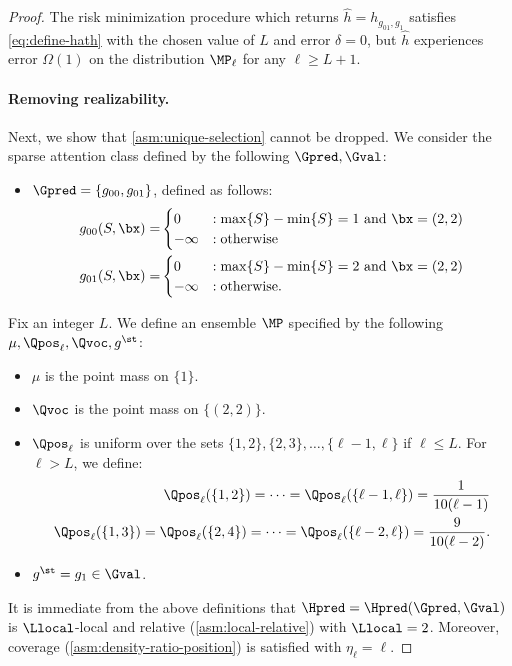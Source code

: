 \documentclass{article}
\begin{document}
\begin{proof}
  The risk minimization procedure which returns $\hat h = h_{g_{01}, g_1}$ satisfies \cref{eq:define-hath} with the chosen value of $L$ and error $\delta = 0$, but $\hat h$ experiences error $\Omega(1)$ on the distribution $\MP_\ell$ for any $\ell \geq L+1$.

  \paragraph{Removing realizability.} Next, we show that \cref{asm:unique-selection} cannot be dropped. We consider the sparse attention class defined by the following $\Gpred, \Gval$:
  \begin{itemize}
\item $\Gpred= \{ g_{00}, g_{01} \}$, defined as follows:
  \begin{align}
    g_{00}(S, \bx) =& \begin{cases}
      0 &: \max\{ S \} - \min\{S \} = 1 \mbox{ and } \bx = (2,2)\\
      -\infty &: \mbox{otherwise}
    \end{cases}\nonumber\\
    g_{01}(S, \bx) =& \begin{cases}
      0& : \max\{S \} - \min\{S \} = 2 \mbox{ and } \bx = (2,2) \\
      -\infty &: \mbox{otherwise}.
      \end{cases}\nonumber
  \end{align}
\end{itemize}
Fix an integer $L$. We define an ensemble $\MP$ specified by the following $\mu, \Qpos_\ell, \Qvoc, g^\st$:
\begin{itemize}
  \item $\mu$ is the point mass on $\{1 \}$. 
  \item $\Qvoc$ is the point mass on $\{ (2,2) \}$. 
  \item $\Qpos_\ell$ is uniform over the sets $\{1, 2\}, \{2,3\}, \ldots, \{\ell-1, \ell \}$ if $\ell \leq L$. For $\ell > L$, we define:
    \begin{align}
      \Qpos_\ell(\{ 1, 2\}) =  \cdots = \Qpos_\ell( \{ \ell-1, \ell \}) = \frac{1}{10(\ell-1)} \nonumber\\
      \Qpos_\ell(\{ 1, 3 \}) = \Qpos_\ell(  \{2, 4\}) =  \cdots = \Qpos_\ell(\{\ell - 2, \ell \})  = \frac{9}{10(\ell-2)}\label{eq:qpos-910}.
    \end{align}
    
    \item $g^\st = g_1 \in \Gval$. 
    \end{itemize}
    It is immediate from the above definitions that $\Hpred = \Hpred(\Gpred, \Gval)$ is $\Llocal$-local and relative (\cref{asm:local-relative}) with $\Llocal = 2$. Moreover, coverage (\cref{asm:density-ratio-position}) is satisfied with $\eta_\ell = \ell$.


\end{proof}
\end{document}
